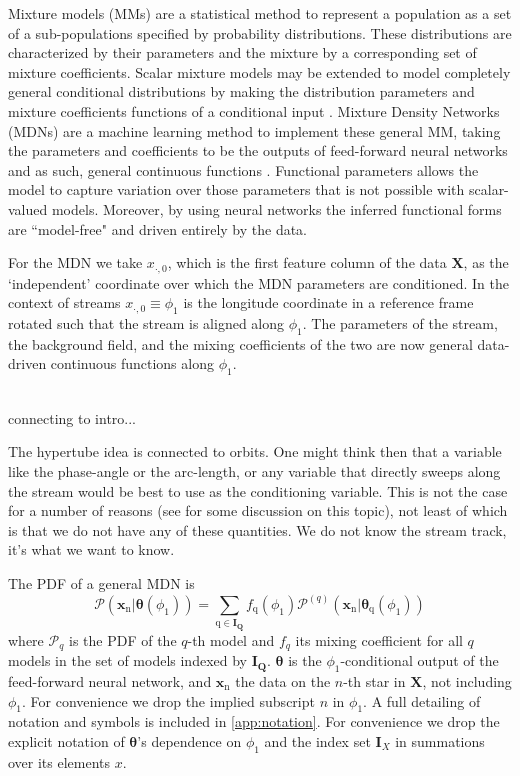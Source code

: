 \documentclass[twocolumn]{aastex631}
\newcommand{\mrm}[1]{\mathrm{#1}}
\newcommand{\mbs}[1]{\boldsymbol{#1}}
\newcommand{\mbf}[1]{\mathbf{#1}}
\newcommand{\mcal}[1]{\mathcal{#1}}
\newcommand{\pdf}{\mcal{P}}
\newcommand{\prior}{\mcal{\pi}}
\newcommand{\nth}[1]{{#1}_{\mrm{n}}}  %
\newcommand{\qth}[1]{{#1}_{\mrm{q}}}  %
\newcommand{\smallcomponent}[2]{#2^{\scriptscriptstyle (#1)}}
\newcommand{\cmp}[2]{\smallcomponent{#1}{#2}}
\begin{document}
        Mixture models (MMs) are a statistical method to represent a population as a set of a sub-populations specified by probability distributions. These distributions are characterized by their parameters and the mixture by a corresponding set of mixture coefficients. Scalar mixture models may be extended to model completely general conditional distributions by making the distribution parameters and mixture coefficients functions of a conditional input \citep{McLachlan1989MixtureM}.
        Mixture Density Networks (MDNs) are a machine learning method to implement these general MM, taking the parameters and coefficients to be the outputs of feed-forward neural networks and as such, general continuous functions \citep{Bishop1994}. Functional parameters allows the model to capture variation over those parameters that is not possible with scalar-valued models. Moreover, by using neural networks the inferred functional forms are ``model-free" and driven entirely by the data.

        For the MDN we take $x_{\cdot, 0}$, which is the first feature column of the data $\mbf{X}$, as the `independent' coordinate over which the MDN parameters are conditioned. In the context of streams $x_{\cdot, 0} \equiv \phi_1$ is the longitude coordinate in a reference frame rotated such that the stream is aligned along $\phi_1$. The parameters of the stream, the background field, and the mixing coefficients of the two are now general data-driven continuous functions along $\phi_1$.
        {\color{cyan} \\ connecting to intro...

            The hypertube idea is connected to orbits.
            One might think then that a variable like the phase-angle or the arc-length, or any variable that directly sweeps along the stream would be best to use as the conditioning variable.
            This is not the case for a number of reasons (see \cite{StarkmanEtAl2023} for some discussion on this topic), not least of which is that we do not have any of these quantities. We do not know the stream track, it's what we want to know.
        }

        The PDF of a general MDN is
        \begin{equation} \label{eq:general_mixture_network}
            \!\!\! \pdf(\nth{\mbs{x}} | \mbs{\theta}(\phi_1))
            \!=\! \sum_{\mrm{q} \in \mbs{I_Q}} \! \qth{f}(\phi_1) \cmp{q}{\pdf}(\nth{\mbs{x}}|\qth{\mbs{\theta}}(\phi_1))
        \end{equation}
        where $\pdf_q$ is the PDF of the $q$-th model and $f_q$ its mixing coefficient for all $q$ models in the set of models indexed by $\mbs{I_Q}$. $\mbs{\theta}$ is the $\phi_1$-conditional output of the feed-forward neural network, and $\nth{\mbs{x}}$ the data on the $n$-th star in $\mbs{X}$, not including $\phi_1$. For convenience we drop the implied subscript $n$ in $\phi_1$. A full detailing of notation and symbols is included in \autoref{app:notation}. For convenience we drop the explicit notation of $\mbs{\theta}$'s dependence on $\phi_1$ and the index set $\mbs{I}_X$ in summations over its elements $x$.
\end{document}
